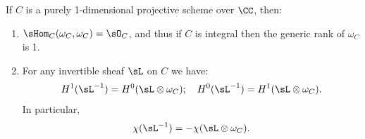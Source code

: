 \begin{proposition}\label{similarities}
If $C$ is a purely 1-dimensional projective scheme over $\CC$, then:
\begin{enumerate}

\item $\sHom_C(\omega_C, \omega_C) = \sO_C$, and  thus if $C$ is integral then the generic rank of $\omega_C$ is 1.

\item For any invertible sheaf $\sL$ on $C$ we have: 
$$
H^1(\sL^{-1})= H^0(\sL\otimes \omega_{C});\quad %
H^0(\sL^{-1} ) = H^1(\sL\otimes \omega_{C}).
$$
In particular,
$$
\chi(\sL^{-1}) = -\chi(\sL\otimes \omega_{C}).
$$

\end{enumerate}
\end{proposition}

